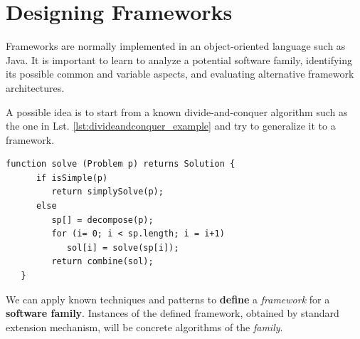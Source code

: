 \section{Designing Frameworks}
Frameworks are normally implemented in an object-oriented language such as Java.
It is important to learn to analyze a potential software family, identifying
its possible common and variable aspects, and evaluating
alternative framework architectures.
\nl

A possible idea is to start from a known divide-and-conquer algorithm such as the one in Lst. \ref{lst:divideandconquer_example} and try to generalize it to a framework.
\begin{lstlisting}[label={lst:divideandconquer_example},caption={Example pseudocode of a Divide-and-Conquer algorithm}]
   function solve (Problem p) returns Solution { 
      if isSimple(p)
         return simplySolve(p);
      else
         sp[] = decompose(p);
         for (i= 0; i < sp.length; i = i+1)
            sol[i] = solve(sp[i]);
         return combine(sol);
   }
\end{lstlisting}
We can apply known techniques and patterns to \textbf{define} a
\textit{framework} for a \textbf{software family}.
Instances of the defined framework, obtained by standard
extension mechanism, 
will be concrete algorithms of the \textit{family}.

